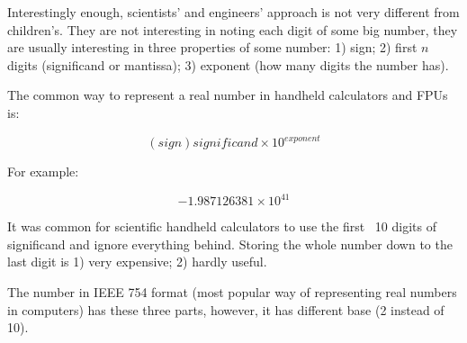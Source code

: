 Interestingly enough, scientists' and engineers' approach is not very different from children's.
They are not interesting in noting each digit of some big number, they are usually interesting in three properties of some number:
1) sign; 2) first $n$ digits (significand or mantissa); 3) exponent (how many digits the number has).

The common way to represent a real number in handheld calculators and FPUs is:

\begin{equation}
(sign) significand \times 10^{exponent}
\end{equation}

For example:

\begin{equation}
-1.987126381 \times 10^{41}
\end{equation}

It was common for scientific handheld calculators to use the first ~10 digits of significand and ignore everything behind.
Storing the whole number down to the last digit is 1) very expensive; 2) hardly useful.

The number in IEEE 754 format (most popular way of representing real numbers in computers) has these three parts, however, 
it has different base (2 instead of 10).

